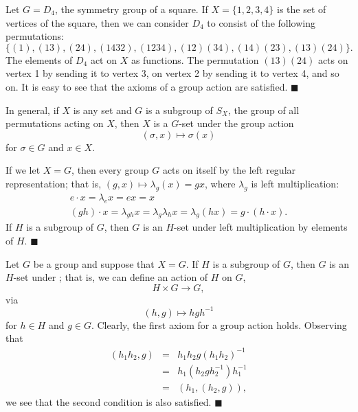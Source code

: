 \medskip

Let $G = D_4$, the symmetry group of a square.  If $X = \{ 1, 2, 3, 4 \}$ is the set of vertices of the square, then we can consider $D_4$
to consist of the following permutations: 
$$
\{ (1), (13), (24), (1432), (1234), (12)(34), (14)(23), (13)(24) \}.
$$
The elements of $D_4$ act on $X$ as functions.  The permutation $(13)(24)$ acts on vertex 1 by sending it to vertex 3, on vertex 2 by
sending it to vertex 4, and so on.  It is easy to see that the  axioms of a group action are satisfied.
\mbox{\hspace{1in}}
\hspace{\fill} $\blacksquare$

\medskip

In general, if $X$ is any set and $G$ is a subgroup of $S_X$, the
group of all permutations acting on $X$, then $X$ is a $G$-set under
the group action 
$$
(\sigma, x) \mapsto \sigma(x)
$$
for $\sigma \in G$ and $x \in X$.
 
 
\medskip
 
 
If we let $X = G$, then every group $G$ acts on itself by the left
regular representation; that is, $(g,x) \mapsto \lambda_g(x) = gx$, 
where  $\lambda_g$ is left multiplication:
$$
\begin{array}{c}
e \cdot x = \lambda_e x = ex = x \\
(gh) \cdot x = \lambda_{gh}x = \lambda_g \lambda_h x =
\lambda_g(hx) = g \cdot ( h \cdot x).
\end{array}
$$
If $H$ is a subgroup of $G$, then $G$ is an $H$-set under left
multiplication by elements of $H$. 
\hspace{\fill} $\blacksquare$
 
 
\medskip
 
 
Let $G$ be a group and suppose that $X=G$. If $H$ is a subgroup of
$G$, then $G$ is an $H$-set under ; that is, we can define an action of
$H$ on $G$, 
$$
H \times G \rightarrow G,
$$
via
$$
(h,g) \mapsto hgh^{-1}
$$
for $h \in H$ and $g \in G$.  Clearly, the first axiom for a group
action holds.  Observing that 
\begin{eqnarray*}
(h_1 h_2, g) &=& h_1 h_2 g (h_1 h_2 )^{-1} \\
&=& h_1( h_2 g h_2^{-1}) h_1^{-1} \\
& = & (h_1, (h_2, g) ),
\end{eqnarray*}
we see that the second condition is also satisfied.
\hspace{\fill} $\blacksquare$
 
